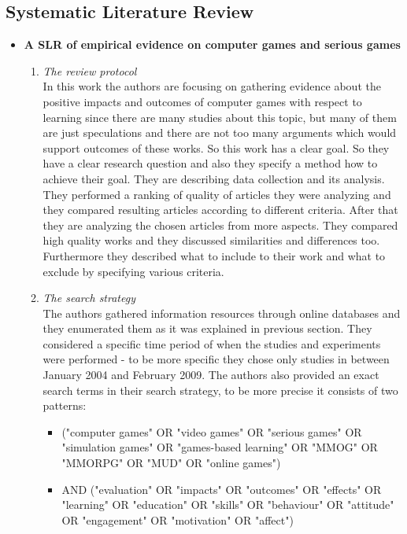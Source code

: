 \subsection*{Systematic Literature Review}
\begin{itemize}
\item \textbf{A SLR of empirical evidence on computer games and serious games \cite{SLR2}}
	\begin{enumerate}
	  	\item \textit{The review protocol} \\
	  	In this work the authors are focusing on gathering evidence about the positive impacts and outcomes of computer games with respect to learning since there are many studies about this topic, but many of them are just speculations and there are not too many arguments which would support outcomes of these works. So this work has a clear goal.	So they have a clear research question and also they specify a method how to achieve their goal. They are describing data collection and its analysis. They performed a ranking of quality of articles they were analyzing and they compared resulting articles according to different criteria. After that they are analyzing the chosen articles from more aspects. They compared high quality works and they discussed similarities and differences too. Furthermore they described what to include to their work and what to exclude by specifying various criteria.
		\item \textit{The search strategy} \\
		The authors gathered information resources through online databases and they enumerated them as it was explained in previous section. They considered a specific time period of when the studies and experiments were performed - to be more specific they chose only studies in between January 2004 and February 2009. The authors also provided an exact search terms in their search strategy, to be more precise it consists of two patterns: 
		\begin{itemize}
			\item ("computer games" OR "video games" OR "serious games" OR "simulation games" OR "games-based learning" OR "MMOG" OR "MMORPG" OR "MUD" OR "online games")
			\item AND ("evaluation" OR "impacts" OR "outcomes" OR "effects" OR "learning" OR "education" OR "skills" OR "behaviour" OR "attitude" OR "engagement" OR "motivation" OR "affect")
		\end{itemize}
	\end{enumerate}
	

\end{itemize}
